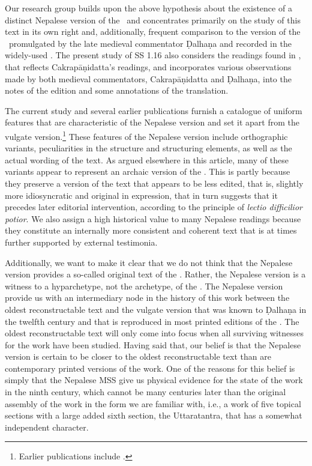 Our research group builds upon the above hypothesis about the existence of a
distinct Nepalese version of the \SS\ and concentrates primarily on the study of
this text in its own right and, additionally, frequent comparison to the version
of the \SS\ promulgated by the late medieval commentator Ḍalhaṇa and recorded in
the widely-used \cite{vulgate}.  The present study of SS 1.16 also considers the
readings found in \cite{acar-1939}, that reflects Cakrapāṇidatta's readings, and
incorporates various observations made by both medieval commentators,
Cakrapāṇidatta and Ḍalhaṇa, into the notes of the edition and some annotations of
the translation. 

The current study and several earlier publications furnish a catalogue of uniform
features that are characteristic of the Nepalese version and set it apart from the
vulgate version.\footnote{ Earlier publications include
    \cite{hari-2011,wuja-2013,birc-2021,birc-2021a}.} These features of the Nepalese
    version include orthographic variants, peculiarities in the structure and
    structuring elements, as well as the actual wording of the text. As argued
    elsewhere in this article, many of these variants appear to represent an archaic
    version of the \SS.  This is partly because they preserve a version of the text
    that appears to be less edited, that is, slightly more idiosyncratic and original
    in expression, that in turn suggests that it precedes later editorial
    intervention, according to the principle of \emph{lectio difficilior potior}. We
    also assign a high historical value to many Nepalese readings  because they
    constitute an internally more consistent and coherent text that is at times
    further supported by external testimonia.

Additionally, we want to make it clear that we do not think that the Nepalese
version provides a so-called original text of the \SS.   Rather, the Nepalese
version is a witness to a hyparchetype, not the archetype, of the \SS.   The
Nepalese version provide us with an intermediary node in the history of this work
between the oldest reconstructable text and the vulgate version that was known to
Ḍalhaṇa in the twelfth century and that is reproduced in most printed editions of
the .  The oldest reconstructable text will only come into focus when all
surviving witnesses for the work have been studied.  Having said that, our belief is
that the Nepalese version is certain to be closer to the oldest reconstructable
text than are contemporary printed versions of the work.  One of the reasons for
this belief is simply that the Nepalese MSS give us physical evidence for the
state of the work in the ninth century, which cannot be many centuries later than
the original assembly of the work in the form we are familiar with, i.e., a work
of five topical sections with a large added sixth section, the Uttaratantra, that
has a somewhat independent character. 

